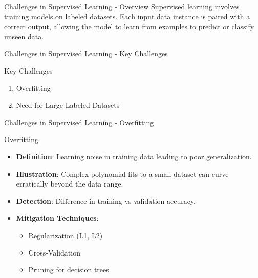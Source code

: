 \documentclass[aspectratio=169]{beamer}
\begin{document}
\begin{frame}[fragile]{Challenges in Supervised Learning - Overview}
    Supervised learning involves training models on labeled datasets. Each input data instance is paired with a correct output, allowing the model to learn from examples to predict or classify unseen data.
\end{frame}

\begin{frame}[fragile]{Challenges in Supervised Learning - Key Challenges}
    \begin{block}{Key Challenges}
        \begin{enumerate}
            \item Overfitting
            \item Need for Large Labeled Datasets
        \end{enumerate}
    \end{block}
\end{frame}

\begin{frame}[fragile]{Challenges in Supervised Learning - Overfitting}
    \begin{block}{Overfitting}
        \begin{itemize}
            \item \textbf{Definition}: Learning noise in training data leading to poor generalization.
            \item \textbf{Illustration}: Complex polynomial fits to a small dataset can curve erratically beyond the data range.
            \item \textbf{Detection}: Difference in training vs validation accuracy.
            \item \textbf{Mitigation Techniques}:
            \begin{itemize}
                \item Regularization (L1, L2)
                \item Cross-Validation
                \item Pruning for decision trees
            \end{itemize}
        \end{itemize}
    \end{block}
\end{frame}
\end{document}

